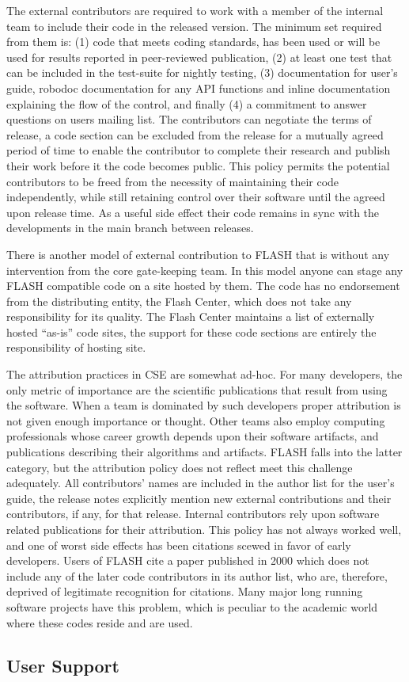 The external contributors are required to work with a member of the
internal team to include their code in the released version. The
minimum set required from them is:  (1) code that meets coding standards,
has been used or will be used for results reported in peer-reviewed
publication, (2) at least one test that can be included in the
test-suite for nightly testing, (3) documentation for user's guide,
robodoc documentation for any API functions and inline documentation
explaining the flow of the control, and finally (4) a commitment to answer
questions on users mailing list. The contributors can negotiate the
terms of release, a code section can be excluded from the release for
a mutually agreed period of time to enable the contributor to complete
their research and publish their work before it the code becomes
public. This policy permits the potential contributors to be freed
from the necessity of maintaining their code independently, while
still retaining control over their software until the agreed upon
release time.  As a useful side effect their code remains in sync with
the developments in the main branch between releases.  

There is another model of external contribution to FLASH that is
without any intervention from the core gate-keeping team. In this
model anyone can stage any FLASH compatible code on a site hosted by
them. The code has no endorsement from the distributing entity, the
Flash Center, which does not take any responsibility for its
quality. The Flash Center maintains a list of externally hosted
``as-is'' code sites, the support for these code sections are entirely
the responsibility of hosting site. 

The attribution practices in CSE are somewhat ad-hoc. For many
developers, the only metric of importance are the scientific
publications that result from using the software. When a team is
dominated by such developers proper attribution is not given enough
importance or thought. Other teams also employ computing professionals
whose career growth depends upon their software artifacts, and
publications describing their algorithms and artifacts. FLASH falls
into the latter category, but the attribution policy does not reflect
meet this challenge adequately. All
contributors' names are included in the author list for the user's
guide, the release notes explicitly mention new external
contributions and their contributors, if any, for that
release. Internal contributors rely upon software related publications
for their attribution. This policy has not always worked well, and one
of worst side effects has been citations scewed in favor of early
developers. Users of FLASH cite a paper published in 2000
\cite{Fryxell2000} which does not include any of the later code
contributors in its author list, who are, therefore, deprived of legitimate
recognition for citations.  Many major long running software projects
have this problem, which is peculiar to the academic world where these
codes reside and are used.  

\subsection{User Support}
\label{sec:FLASHUsers}